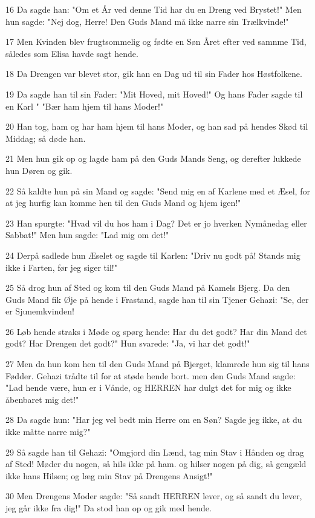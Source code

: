 \par 16 Da sagde han: "Om et År ved denne Tid har du en Dreng ved Brystet!" Men hun sagde: "Nej dog, Herre! Den Guds Mand må ikke narre sin Trælkvinde!"
\par 17 Men Kvinden blev frugtsommelig og fødte en Søn Året efter ved samnme Tid, således som Elisa havde sagt hende.
\par 18 Da Drengen var blevet stor, gik han en Dag ud til sin Fader hos Høstfolkene.
\par 19 Da sagde han til sin Fader: "Mit Hoved, mit Hoved!" Og hans Fader sagde til en Karl " "Bær ham hjem til hans Moder!"
\par 20 Han tog, ham og har ham hjem til hans Moder, og han sad på hendes Skød til Middag; så døde han.
\par 21 Men hun gik op og lagde ham på den Guds Mands Seng, og derefter lukkede hun Døren og gik.
\par 22 Så kaldte hun på sin Mand og sagde: "Send mig en af Karlene med et Æsel, for at jeg hurfig kan komme hen til den Guds Mand og hjem igen!"
\par 23 Han spurgte: "Hvad vil du hos ham i Dag? Det er jo hverken Nymånedag eller Sabbat!" Men hun sagde: "Lad mig om det!"
\par 24 Derpå sadlede hun Æselet og sagde til Karlen: "Driv nu godt på! Stands mig ikke i Farten, før jeg siger til!"
\par 25 Så drog hun af Sted og kom til den Guds Mand på Kamels Bjerg. Da den Guds Mand fik Øje på hende i Frastand, sagde han til sin Tjener Gehazi: "Se, der er Sjunemkvinden!
\par 26 Løb hende straks i Møde og spørg hende: Har du det godt? Har din Mand det godt? Har Drengen det godt?" Hun svarede: "Ja, vi har det godt!"
\par 27 Men da hun kom hen til den Guds Mand på Bjerget, klamrede hun sig til hans Fødder. Gehazi trådte til for at støde hende bort. men den Guds Mand sagde: "Lad hende være, hun er i Vånde, og HERREN har dulgt det for mig og ikke åbenbaret mig det!"
\par 28 Da sagde hun: "Har jeg vel bedt min Herre om en Søn? Sagde jeg ikke, at du ikke måtte narre mig?"
\par 29 Så sagde han til Gehazi: "Omgjord din Lænd, tag min Stav i Hånden og drag af Sted! Møder du nogen, så hils ikke på ham. og hilser nogen på dig, så gengæld ikke hans Hilsen; og læg min Stav på Drengens Ansigt!"
\par 30 Men Drengens Moder sagde: "Så sandt HERREN lever, og så sandt du lever, jeg går ikke fra dig!" Da stod han op og gik med hende.
